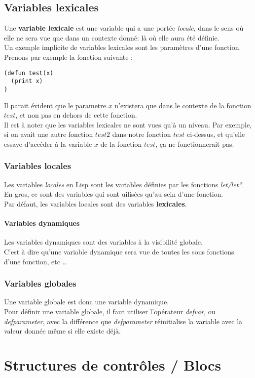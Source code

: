 \documentclass{report}
\begin{document}
\subsection{Variables lexicales}
Une \textbf{variable lexicale} est une variable qui a une portée \emph{locale}, dans le sens où elle ne sera vue que dans un contexte donné: là où elle aura été définie.\\
Un exemple implicite de variables lexicales sont les paramètres d'une fonction.
Prenons par exemple la fonction suivante :
\begin{verbatim}
(defun test(x)
  (print x)
)
\end{verbatim}
Il parait évident que le parametre $x$ n'existera que dans le contexte de la fonction $test$, et non pas en dehors de cette fonction.\\
Il est à noter que les variables lexicales ne sont vues qu'à un niveau.
Par exemple, si on avait une autre fonction $test2$ dans notre fonction $test$ ci-dessus, et qu'elle essaye d'accéder à la variable $x$ de la fonction $test$, ça ne fonctionnerait pas.
\subsubsection{Variables locales}
Les variables \emph{locales} en Lisp sont les variables définies par les fonctions \emph{let/let*}.
En gros, ce sont des variables qui sont uilisées qu'au sein d'une fonction.\\
Par défaut, les variables locales sont des variables \textbf{lexicales}.
    
\paragraph{Variables dynamiques}
Les variables dynamiques sont des variables à la visibilité globale.\\
C'est à dire qu'une variable dynamique sera vue de toutes les sous fonctions d'une fonction, etc \ldots
\subsubsection{Variables globales}
Une variable globale est donc une variable dynamique.\\
Pour définir une variable globale, il faut utiliser l'opérateur \emph{defvar}, ou \emph{defparameter}, avec la différence que \emph{defparameter} réinitialise la variable avec la valeur donnée même si elle existe déjà.

\section{Structures de contrôles / Blocs}
\end{document}

